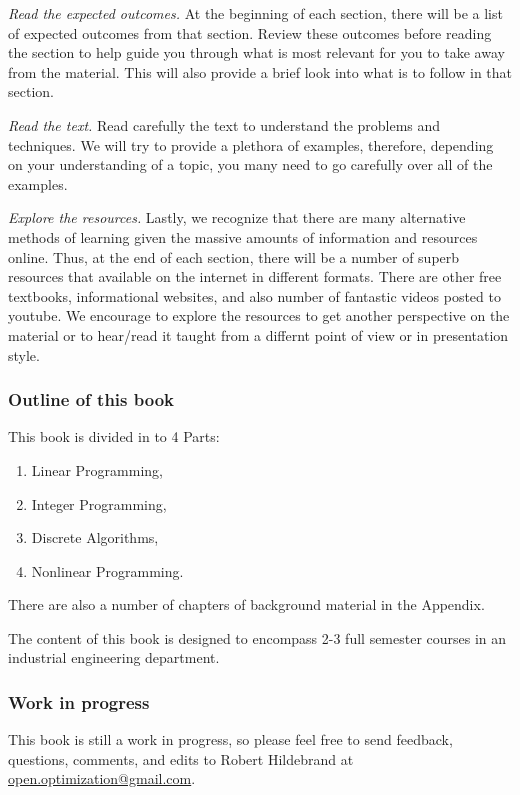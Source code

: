 \emph{Read the expected outcomes.} At the beginning of each section, there will be a list of expected outcomes from that section.  Review these outcomes before reading the section to help guide you through what is most relevant for you to take away from the material.  This will also provide a brief look into what is to follow in that section.

\emph{Read the text.} Read carefully the text to understand the problems and techniques.  We will try to provide a plethora of examples, therefore, depending on your understanding of a topic, you many need to go carefully over all of the examples.

\emph{Explore the resources.} Lastly, we recognize that there are many alternative methods of learning given the massive amounts of information and resources online.   Thus, at the end of each section, there will be a number of superb resources that available on the internet in different formats.   There are other free textbooks, informational websites, and also number of fantastic videos posted to youtube.  We encourage to explore the resources to get another perspective on the material or to hear/read it taught from a differnt point of view or in presentation style.  


\subsubsection*{Outline of this book}
This book is divided in to 4 Parts: 
\begin{enumerate}
\item[Part I] Linear Programming,
\item[Part II] Integer Programming,
\item[Part III] Discrete Algorithms,
\item[Part IV]  Nonlinear Programming.
\end{enumerate}
There are also a number of chapters of background material in the Appendix.

The content of this book is designed to encompass 2-3 full semester courses in an industrial engineering department. 

\subsubsection*{Work in progress}
This book is still a work in progress, so please feel free to send feedback, questions, comments, and edits to Robert Hildebrand at \url{open.optimization@gmail.com}.

